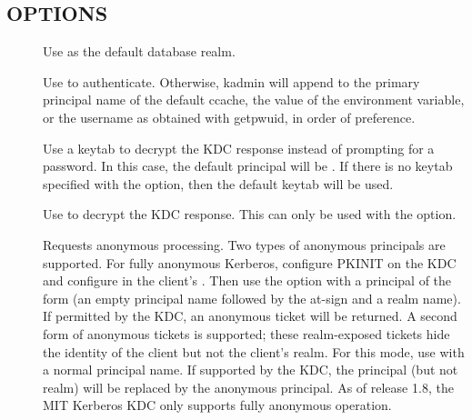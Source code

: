 \documentclass[letterpaper,10pt,english]{sphinxmanual}
\begin{document}
\subsection{OPTIONS}
\label{\detokenize{admin/admin_commands/kadmin_local:options}}\label{\detokenize{admin/admin_commands/kadmin_local:kadmin-options}}\begin{description}
\item[{ }] \leavevmode
Use  as the default database realm.

\item[{ }] \leavevmode
Use  to authenticate.  Otherwise, kadmin will append
 to the primary principal name of the default ccache,
the value of the  environment variable, or the username as
obtained with getpwuid, in order of preference.

\item[{}] \leavevmode
Use a keytab to decrypt the KDC response instead of prompting for
a password.  In this case, the default principal will be
.  If there is no keytab specified with the
 option, then the default keytab will be used.

\item[{ }] \leavevmode
Use  to decrypt the KDC response.  This can only be used
with the  option.

\item[{}] \leavevmode
Requests anonymous processing.  Two types of anonymous principals
are supported.  For fully anonymous Kerberos, configure PKINIT on
the KDC and configure  in the client’s
{\hyperref[\detokenize{admin/conf_files/krb5_conf:krb5-conf-5}]{}}.  Then use the  option with a principal
of the form  (an empty principal name followed by the
at-sign and a realm name).  If permitted by the KDC, an anonymous
ticket will be returned.  A second form of anonymous tickets is
supported; these realm-exposed tickets hide the identity of the
client but not the client’s realm.  For this mode, use  with a normal principal name.  If supported by the KDC, the
principal (but not realm) will be replaced by the anonymous
principal.  As of release 1.8, the MIT Kerberos KDC only supports
fully anonymous operation.


\end{description}
\end{document}
